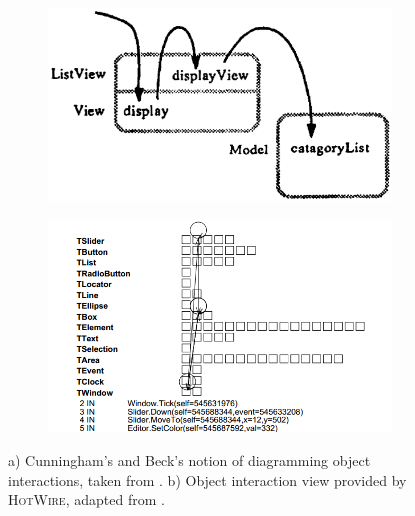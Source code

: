 \begin{figure}[b]
	\centering
	
	\begin{subfigure}[b]{0.45\textwidth}
		\centering
        \includegraphics[width=\textwidth]{../images/06-Cunningham-Diagram}
        \caption[Object Interaction Diagrams by Cunningham and Beck]{}
		\label{fig:DebugCunningham}
	\end{subfigure}
	\quad
	\begin{subfigure}[b]{0.45\textwidth}
		\centering
		\includegraphics[width=\textwidth]{../images/06-Laffra-HotWire}
		\caption[Object Interaction View provided by \textsc{HotWire}]{}
		\label{fig:DebugLaffra}
	\end{subfigure}
	
	\caption[TOC Caption]{
		a) Cunningham's and Beck's notion of diagramming object interactions, taken from \cite{cunningham_diagram_1986}.
		b) Object interaction view provided by \textsc{HotWire}, adapted from \cite{laffra_hotwire:_1994}.
	}
\end{figure}

